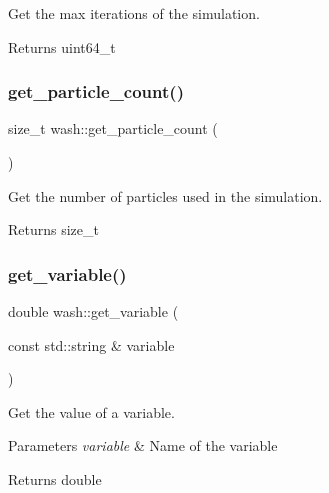 Get the max iterations of the simulation. 

\begin{DoxyReturn}{Returns}
uint64\+\_\+t 
\end{DoxyReturn}
\mbox{\label{namespacewash_a3b281fefe2419e7bc1450029b0324ab8}} 
\subsubsection{\texorpdfstring{get\+\_\+particle\+\_\+count()}{get\_particle\_count()}}
{\footnotesize\ttfamily size\+\_\+t wash\+::get\+\_\+particle\+\_\+count (\begin{DoxyParamCaption}{ }\end{DoxyParamCaption})}



Get the number of particles used in the simulation. 

\begin{DoxyReturn}{Returns}
size\+\_\+t 
\end{DoxyReturn}
\mbox{\label{namespacewash_a6c61472c6ffa0cb654bc9497292b7f30}} 
\subsubsection{\texorpdfstring{get\+\_\+variable()}{get\_variable()}}
{\footnotesize\ttfamily double wash\+::get\+\_\+variable (\begin{DoxyParamCaption}\item[{const std\+::string \&}]{variable }\end{DoxyParamCaption})}



Get the value of a variable. 


\begin{DoxyParams}{Parameters}
{\em variable} & Name of the variable \\
\hline
\end{DoxyParams}
\begin{DoxyReturn}{Returns}
double 
\end{DoxyReturn}
\mbox{\label{namespacewash_a24bef1df5fe5c24cd518f12885a51055}} 

